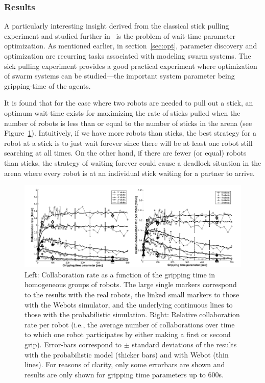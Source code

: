 \documentclass[Main.tex]{subfiles}
\begin{document}
\subsubsection*{Results}
A particularly interesting insight derived from the classical stick pulling experiment and studied further in~\cite{Ijspeert2001} is the problem of wait-time parameter optimization. As mentioned earlier, in section~\ref{sec:opt}, parameter discovery and optimization are recurring tasks associated with modeling swarm systems. The sick pulling experiment provides a good practical experiment where optimization of swarm systems can be studied---the important system parameter being gripping-time of the agents.

It is found that for the case where two robots are needed to pull out a stick, an optimum wait-time exists for maximizing the rate of sticks pulled when the number of robots is less than or equal to the number of sticks in the arena (see Figure~\ref{fig:stickopt}). Intuitively, if we have more robots than sticks, the best strategy for a robot at a stick is to just wait forever since there will be at least one robot still searching at all times. On the other hand, if there are fewer (or equal) robots than sticks, the strategy of waiting forever could cause a deadlock situation in the arena where every robot is at an individual stick waiting for a partner to arrive.

\begin{figure}[!ht]
\centering\includegraphics[width=.85\textwidth]{stickopt.png}
\centering\caption{Left: Collaboration rate as a function of the gripping time in homogeneous groups of robots. The large single markers correspond to the results with the real robots, the linked small markers to those with the Webots simulator, and the underlying continuous lines to those with the probabilistic simulation. Right: Relative collaboration rate per robot (i.e., the average number of collaborations over time to which one robot participates by either making a first or second grip). Error-bars correspond to $\pm$ standard deviations of the results with the probabilistic model (thicker bars) and with Webot (thin lines). For reasons of clarity, only some errorbars are shown and results are only shown for gripping time parameters up to 600s.}\label{fig:stickopt}
\end{figure}
\end{document}
